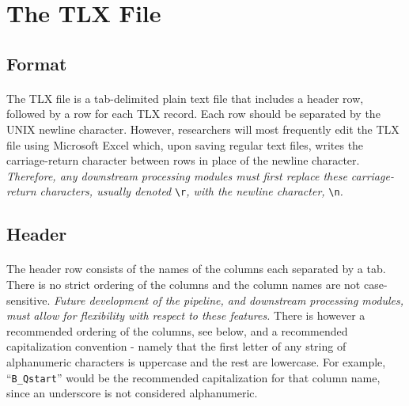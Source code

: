 \documentclass{article}
\begin{document}
\section{The TLX File}

\subsection{Format}
\paragraph{} The TLX file is a tab-delimited plain text file that includes a header row, followed by a row for each TLX record. Each row should be separated by the UNIX newline character. However, researchers will most frequently edit the TLX file using Microsoft Excel which, upon saving regular text files, writes the carriage-return character between rows in place of the newline character. \emph{Therefore, any downstream processing modules must first replace these carriage-return characters, usually denoted} \texttt{\textbackslash{}r}\emph{, with the newline character,} \texttt{\textbackslash{}n}\emph{.}

\subsection{Header}
\paragraph{} The header row consists of the names of the columns each separated by a tab. There is no strict ordering of the columns and the column names are not case-sensitive. \emph {Future development of the pipeline, and downstream processing modules, must allow for flexibility with respect to these features.} There is however a recommended ordering of the columns, see below, and a recommended capitalization convention - namely that the first letter of any string of alphanumeric characters is uppercase and the rest are lowercase. For example, ``\texttt{B\_Qstart}'' would be the recommended capitalization for that column name, since an underscore is not considered alphanumeric.
\end{document}
